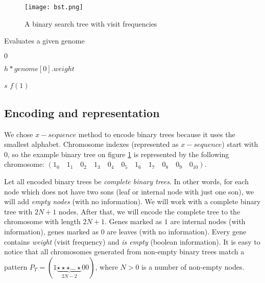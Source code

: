 \documentclass[12pt]{article}
\newlength\singleindent
\newlength\doubleindent
\newcommand\bindent{%
  \begingroup
  \setlength{\itemindent}{\singleindent}
  \addtolength{\algorithmicindent}{\singleindent}
}
\newcommand\bbindent{%
  \begingroup
  \setlength{\itemindent}{\doubleindent}
  \addtolength{\algorithmicindent}{\doubleindent}
}
\newcommand\eindent{\endgroup}
\begin{document}
\begin{figure}[ht]
\centering
\texttt{[image: bst.png]}
\caption{A binary search tree with visit frequencies}
\label{fig:bst}
\end{figure}

\begin{algorithm}
\scriptsize
\caption{Evaluates a given genome}
\begin{algorithmic}[]
    \bindent

        \bbindent
                \RETURN $0$
            \ENDIF

                \RETURN $h * genome[0].weight$
            \ENDIF



            \RETURN $s$
        \eindent
        \RETURN $f(1)$
    \eindent
\end{algorithmic}
\end{algorithm}

\subsection{Encoding and representation}
We chose $x-sequence$ method to encode binary trees because it uses the smallest alphabet.
Chromosome indexes (represented as $x-sequence$) start with $0$, so the example binary tree on figure \ref{fig:bst} is represented by the following chromosome: $(1_0\quad 1_1\quad  0_2\quad 1_3\quad 0_4\quad 0_5\quad 1_6\quad 1_7\quad 0_8\quad 0_9\quad 0_{10})$.

Let all encoded binary trees be \textit{complete binary trees}. In other words, for each node which does not have two sons (leaf or internal node with just one son), we will add \textit{empty nodes} (with no information). We will work with a complete binary tree with $2N + 1$ nodes. After that, we will encode the complete tree to the chromosome with length $2N + 1$.
Genes marked as $1$ are internal nodes (with information), genes marked as $0$ are leaves (with no information).
Every gene contains \textit{weight} (visit frequency) and \textit{is empty} (boolean information).
It is easy to notice that all chromosomes generated from non-empty binary trees match a pattern
$P_{T} = (1 \underbrace{\star \star \star \ldots \star}_{2N-2} 0 0)$, where $N > 0$ is a number of non-empty nodes.
\end{document}
